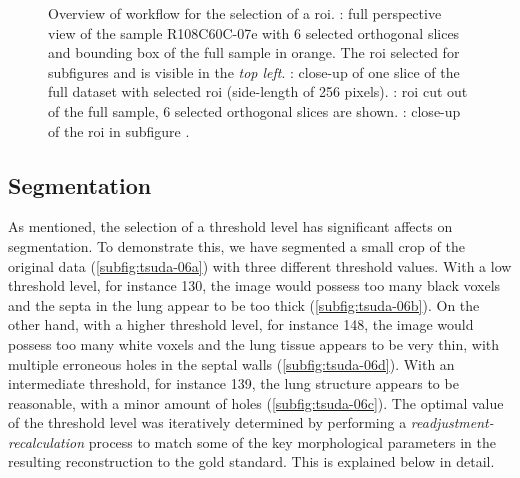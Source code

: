 \begin{figure}[p]
{{			\label{subfig:tsuda-05d}%
		}%
	}%
	\caption[Overview of workflow for \acs{roi} selection]{Overview of workflow for the selection of a \acf{roi}. : full perspective view of the sample R108C60C-07e with 6 selected orthogonal slices and bounding box of the full sample in orange. The \ac{roi} selected for subfigures  and  is visible in the \emph{top left}. : close-up of one slice of the full dataset with selected \ac{roi} (side-length of 256 pixels). : \ac{roi} cut out of the full sample, 6 selected orthogonal slices are shown. : close-up of the \ac{roi} in subfigure .}
	\label{fig:tsuda-05}
\end{figure}%

\subsection{Segmentation}
As mentioned, the selection of a threshold level has significant affects on segmentation. To demonstrate this, we have segmented a small crop of the original data (\autoref{subfig:tsuda-06a}) with three different threshold values. With a low threshold level, for instance 130, the image would possess too many black voxels and the septa in the lung appear to be too thick (\autoref{subfig:tsuda-06b}). On the other hand, with a higher threshold level, for instance 148, the image would possess too many white voxels and the lung tissue appears to be very thin, with multiple erroneous holes in the septal walls (\autoref{subfig:tsuda-06d}). With an intermediate threshold, for instance 139, the lung structure appears to be reasonable, with a minor amount of holes (\autoref{subfig:tsuda-06c}). The optimal value of the threshold level was iteratively determined by performing a \emph{readjustment-recalculation} process to match some of the key morphological parameters in the resulting \threed reconstruction to the gold standard. This is explained below in detail.


